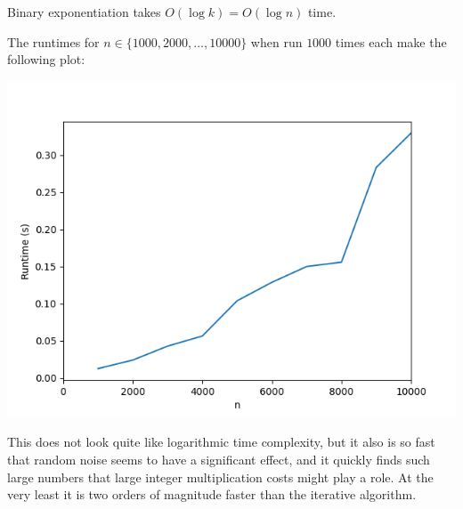 \documentclass[12pt]{article}
\begin{document}
    Binary exponentiation takes $O(\log k) = O(\log n)$ time.

    The runtimes for $n \in \{1000, 2000, \dots, 10000\}$
    when run $1000$ times each make the following plot:

    \includegraphics[scale=0.65]{binary}

    This does not look quite like logarithmic time complexity,
    but it also is so fast that random noise seems to have a significant effect,
    and it quickly finds such large numbers that large integer multiplication
    costs might play a role.
    At the very least it is two orders of magnitude faster than the iterative algorithm.
\end{document}
